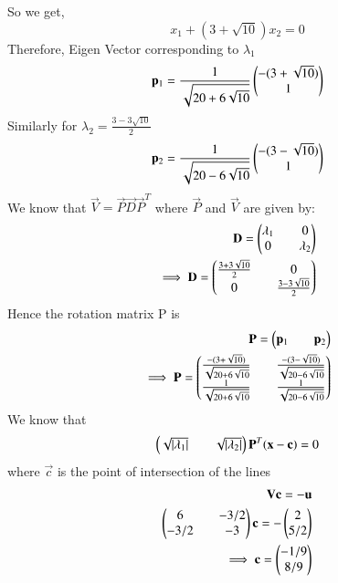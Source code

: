 So we get,
\begin{equation}\label{eq:solutions/2/6/24/eq:2.14}
x_1 + (3+\sqrt{10})x_2 = 0
\end{equation}
Therefore, Eigen Vector corresponding to $\lambda_1$
\begin{equation}\label{eq:solutions/2/6/24/eq:2.15}
\mathbf{p}_1 =\frac{1}{\sqrt{20+6\sqrt{10}}} \begin{pmatrix}-(3+\sqrt{10}) \\ 1\end{pmatrix}
\end{equation}
Similarly for $\lambda_2 = \frac{3-3\sqrt{10}}{2}$
\begin{equation}\label{eq:solutions/2/6/24/eq:2.16}
\mathbf{p}_2 =\frac{1}{\sqrt{20-6\sqrt{10}}} \begin{pmatrix}-(3-\sqrt{10}) \\ 1\end{pmatrix}
\end{equation}
We know that $\vec{V} = \vec{P}\vec{D}\vec{P}^T$ where $\vec{P}$ and $\vec{V}$ are given by:
\begin{equation} \label{eq:solutions/2/6/24/eq:2.17}
\begin{split}
\mathbf{D} = \begin{pmatrix}\lambda_1 && 0\\ 0 && \lambda_2\end{pmatrix}\\
\implies \mathbf{D} = \begin{pmatrix}\frac{3+3\sqrt{10}}{2} && 0\\ 0 &&\frac{3-3\sqrt{10}}{2} \end{pmatrix}
\end{split}
\end{equation}
Hence the rotation matrix P is
\begin{equation} \label{eq:solutions/2/6/24/eq:2.18}
\begin{split}
\mathbf{P} = \begin{pmatrix}\mathbf{p}_1 && \mathbf{p}_2\end{pmatrix}\\
\implies \mathbf{P} = \begin{pmatrix}\frac{-(3+\sqrt{10})}{\sqrt{20+6\sqrt{10}}} && \frac{-(3-\sqrt{10})}{\sqrt{20-6\sqrt{10}}} \\ \frac{1}{\sqrt{20+6\sqrt{10}}} && \frac{1}{\sqrt{20-6\sqrt{10}}}\end{pmatrix}
\end{split}
\end{equation}
We know that 
\begin{equation} \label{eq:solutions/2/6/24/eq:2.19}
\begin{pmatrix}\sqrt{|\lambda_1|} && \sqrt{|\lambda_2|}\end{pmatrix}\mathbf{P}^T(\mathbf{x}-\mathbf{c}) = 0
\end{equation}
where $\vec{c}$ is the point of intersection of the lines 
\begin{equation} \label{eq:solutions/2/6/24/eq:2.20}
\begin{split}
\mathbf{V}\mathbf{c} = -\mathbf{u}\\
\begin{pmatrix}6 && -3/2\\-3/2 && -3\end{pmatrix} \mathbf{c} = -\begin{pmatrix}2 \\ 5/2\end{pmatrix}\\
\implies \mathbf{c} = \begin{pmatrix}-1/9 \\ 8/9\end{pmatrix}
\end{split}
\end{equation}
